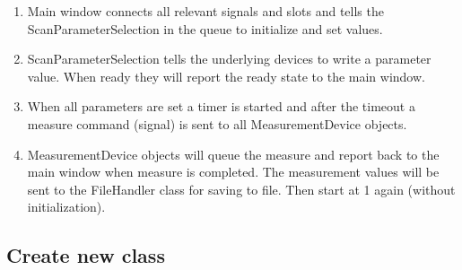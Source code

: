 \begin{enumerate}
	\item Main window connects all relevant signals and slots and tells the \\
	ScanParameterSelection in the queue to initialize and set values.
	\item ScanParameterSelection tells the underlying devices to write a parameter value. When ready they will report the ready state to the main window.
	\item When all parameters are set a timer is started and after the timeout a measure command (signal) is sent to all MeasurementDevice objects.
	\item MeasurementDevice objects will queue the measure and report back to the main window when measure is completed. The measurement values will be sent to the FileHandler class for saving to file. Then start at 1 again (without initialization).
\end{enumerate}

\newpage
\subsection{Create new class}
